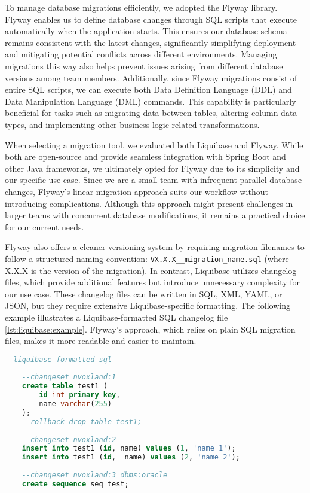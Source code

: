 To manage database migrations efficiently, we adopted the Flyway library. Flyway enables us to define database changes through SQL scripts that execute automatically when the application starts. This ensures our database schema remains consistent with the latest changes, significantly simplifying deployment and mitigating potential conflicts across different environments. Managing migrations this way also helps prevent issues arising from different database versions among team members. Additionally, since Flyway migrations consist of entire SQL scripts, we can execute both Data Definition Language (DDL) and Data Manipulation Language (DML) commands. This capability is particularly beneficial for tasks such as migrating data between tables, altering column data types, and implementing other business logic-related transformations.

When selecting a migration tool, we evaluated both Liquibase and Flyway. While both are open-source and provide seamless integration with Spring Boot and other Java frameworks, we ultimately opted for Flyway due to its simplicity and our specific use case. Since we are a small team with infrequent parallel database changes, Flyway’s linear migration approach suits our workflow without introducing complications. Although this approach might present challenges in larger teams with concurrent database modifications, it remains a practical choice for our current needs.

Flyway also offers a cleaner versioning system by requiring migration filenames to follow a structured naming convention: \texttt{VX.X.X\_\_migration\_name.sql} (where X.X.X is the version of the migration). In contrast, Liquibase utilizes changelog files, which provide additional features but introduce unnecessary complexity for our use case. These changelog files can be written in SQL, XML, YAML, or JSON, but they require extensive Liquibase-specific formatting. The following example illustrates a Liquibase-formatted SQL changelog file \ref{lst:liquibase:example}. Flyway’s approach, which relies on plain SQL migration files, makes it more readable and easier to maintain.

\begin{lstlisting}[language=Sql,caption=Liquibase example changelog,label=lst:liquibase:example]
    --liquibase formatted sql
    
    --changeset nvoxland:1
    create table test1 (  
        id int primary key,
        name varchar(255)  
    );  
    --rollback drop table test1; 
    
    --changeset nvoxland:2 
    insert into test1 (id, name) values (1, 'name 1');
    insert into test1 (id,  name) values (2, 'name 2');  
    
    --changeset nvoxland:3 dbms:oracle
    create sequence seq_test;
\end{lstlisting}
    
